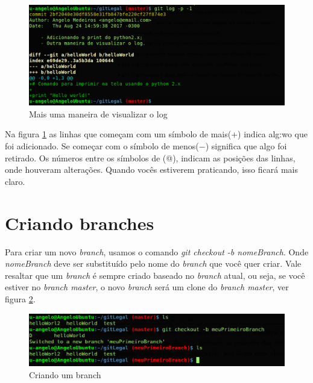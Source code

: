 \documentclass[12pt,openright,oneside,a4paper,english,brazil]{abntex2}
\begin{document}
\begin{figure}[H]
	\caption{\label{logp}Mais uma maneira de visualizar o log}
	\begin{center}
		\includegraphics[width=1\linewidth]{logp}
	\end{center}
\end{figure}

Na figura \ref{logp} as linhas que começam com um símbolo de mais(+) indica alg:wo que foi adicionado. Se começar com o símbolo de menos($-$) significa que algo foi retirado. Os números entre os símbolos de (@), indicam as posições das linhas, onde houveram alterações. Quando vocês estiverem praticando, isso ficará mais claro.

\section{Criando branches}

Para criar um novo \textit{branch}, usamos o comando \textit{git checkout -b nomeBranch}. Onde \textit{nomeBranch} deve ser substituído pelo nome do \textit{branch} que você quer criar. Vale resaltar que um \textit{branch} é sempre criado baseado no \textit{branch} atual, ou seja, se você estiver no\textit{ branch master}, o novo \textit{branch} será um clone do \textit{branch master}, ver figura \ref{novobranch}.

\begin{figure}[H]
	\caption{\label{novobranch}Criando um branch}
	\begin{center}
		\includegraphics[width=1\linewidth]{novobranch}
	\end{center}
\end{figure}
\end{document}
